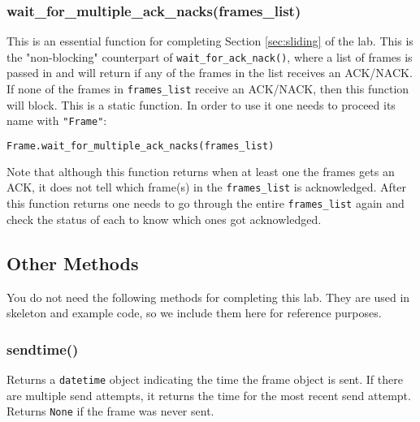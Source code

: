 \documentclass[11pt]{article}
\begin{document}
\subsubsection{wait\_for\_multiple\_ack\_nacks(frames\_list)}
This is an essential function for completing Section \ref{sec:sliding} of the lab.
This is the "non-blocking" counterpart of \texttt{wait\_for\_ack\_nack()}, where a list of frames is passed in and will return if any of the frames in the list receives an ACK/NACK.
If none of the frames in \texttt{frames\_list} receive an ACK/NACK, then this function will block.
This is a static function. In order to use it one needs to proceed its name with \texttt{"Frame"}:
\begin{lstlisting}[caption={Frame status}, language=python]
Frame.wait_for_multiple_ack_nacks(frames_list)
\end{lstlisting}
Note that although this function returns when at least one the frames gets an ACK, it does not tell which frame(s) in the \texttt{frames\_list} is acknowledged.
After this function returns one needs to go through the entire \texttt{frames\_list} again and check the status of each to know which ones got acknowledged.

\subsection{Other Methods}
You do not need the following methods for completing this lab. They are used in skeleton and example code, so we include them here for reference purposes.

\subsubsection{sendtime()}
Returns a \texttt{datetime} object indicating the time the frame object is sent.
If there are multiple send attempts, it returns the time for the most recent send attempt.
Returns \texttt{None} if the frame was never sent.
\end{document}

